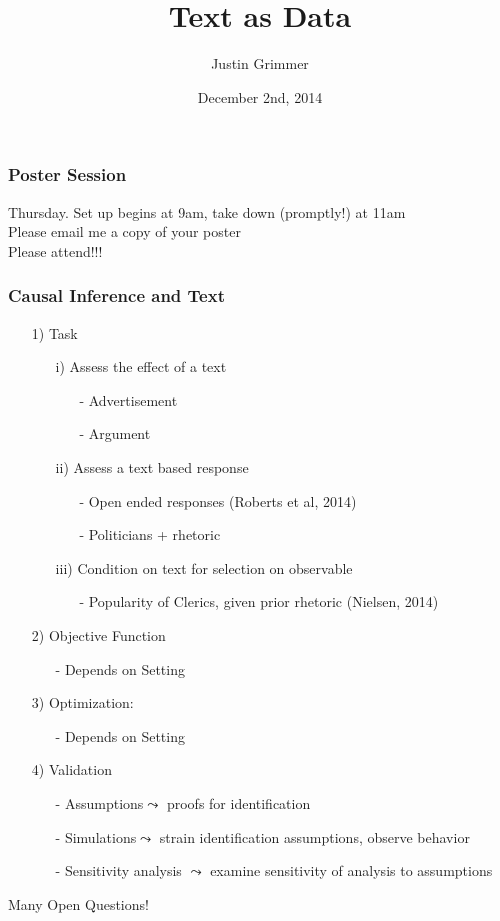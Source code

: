 \documentclass{beamer}
\title[Text as Data] %
{Text as Data}
\author{Justin Grimmer}
\institute[Stanford University]{Associate Professor\\Department of Political Science \\  Stanford University}
\date{December 2nd, 2014}%
\begin{document}
\begin{frame}
\titlepage
\end{frame}


\begin{frame}
\frametitle{Poster Session}

Thursday.  Set up begins at 9am, take down (promptly!) at 11am\\

Please email me a copy of your poster\\

Please attend!!!


\end{frame}


\begin{frame}
\frametitle{Causal Inference and Text}

\begin{small}
\begin{itemize}
\item[1)] Task
\begin{itemize}
\item[i)] Assess the effect of a text
\begin{itemize}
\item[-] Advertisement
\item[-] Argument
\end{itemize}
\item[ii)] Assess a text based response 
\begin{itemize}
\item[-] Open ended responses (Roberts et al, 2014)
\item[-] Politicians + rhetoric 
\end{itemize}
\item[iii)] Condition on text for selection on observable
\begin{itemize}
\item[-] Popularity of Clerics, given prior rhetoric (Nielsen, 2014)
\end{itemize}
\end{itemize}
\item[2)] Objective Function
\begin{itemize}
\item[-] Depends on Setting
\end{itemize}
\item[3)] Optimization: 
\begin{itemize}
\item[-] Depends on Setting
\end{itemize}
\item[4)] Validation
\begin{itemize}
\item[-] Assumptions$\leadsto$ proofs for identification
\item[-] Simulations$\leadsto$ strain identification assumptions, observe behavior
\item[-] Sensitivity analysis $\leadsto$ examine sensitivity of analysis to assumptions
\end{itemize}
\end{itemize}
\alert{Many Open Questions!}
\end{small}
\end{frame}
\end{document}
